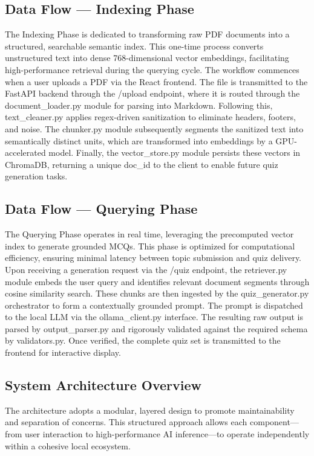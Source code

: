 \documentclass[12pt,a4paper]{report}
\begin{document}
\subsection{Data Flow — Indexing Phase}
The Indexing Phase is dedicated to transforming raw PDF documents into a structured, searchable semantic index. This one-time process converts unstructured text into dense 768-dimensional vector embeddings, facilitating high-performance retrieval during the querying cycle.
The workflow commences when a user uploads a PDF via the React frontend. The file is transmitted to the FastAPI backend through the /upload endpoint, where it is routed through the document\_loader.py module for parsing into Markdown. Following this, text\_cleaner.py applies regex-driven sanitization to eliminate headers, footers, and noise.
The chunker.py module subsequently segments the sanitized text into semantically distinct units, which are transformed into embeddings by a GPU-accelerated model. Finally, the vector\_store.py module persists these vectors in ChromaDB, returning a unique doc\_id to the client to enable future quiz generation tasks.
\subsection{Data Flow — Querying Phase}
The Querying Phase operates in real time, leveraging the precomputed vector index to generate grounded MCQs. This phase is optimized for computational efficiency, ensuring minimal latency between topic submission and quiz delivery.
Upon receiving a generation request via the /quiz endpoint, the retriever.py module embeds the user query and identifies relevant document segments through cosine similarity search. These chunks are then ingested by the quiz\_generator.py orchestrator to form a contextually grounded prompt.
The prompt is dispatched to the local LLM via the ollama\_client.py interface. The resulting raw output is parsed by output\_parser.py and rigorously validated against the required schema by validators.py. Once verified, the complete quiz set is transmitted to the frontend for interactive display.
\subsection{System Architecture Overview}
The architecture adopts a modular, layered design to promote maintainability and separation of concerns. This structured approach allows each component—from user interaction to high-performance AI inference—to operate independently within a cohesive local ecosystem.
\end{document}
